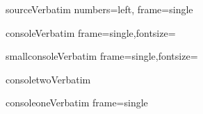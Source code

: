

\DefineVerbatimEnvironment%
 {source}{Verbatim}
 {numbers=left,
 frame=single}

\newcommand\includesource[1] {
\VerbatimInput[frame=single,numbers=left,fontsize=\footnotesize]{#1}
}

\newcommand\includesourcenonumbers[1] {
\VerbatimInput[frame=single,fontsize=\footnotesize]{#1}
}

\newcommand\includesourcenonumberslabel[1] {
\VerbatimInput[frame=single,fontsize=\footnotesize]{#1}
\vspace{-0.5cm}
\begin{center}{{\scriptsize \texttt{#1}}}\end{center} %
}

\DefineVerbatimEnvironment%
 {console}{Verbatim}
 {frame=single,fontsize=\footnotesize}

\DefineVerbatimEnvironment%
 {smallconsole}{Verbatim}
 {frame=single,fontsize=\small}

\DefineVerbatimEnvironment%
 {consoletwo}{Verbatim}
 {}

\DefineVerbatimEnvironment%
 {consoleone}{Verbatim}
 {frame=single}

\usepackage{atbeginend}


